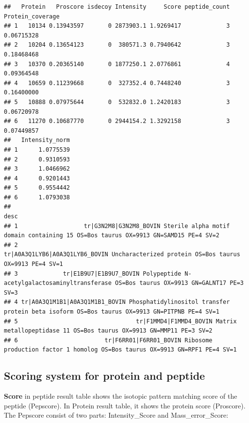 \documentclass[
]{article}
\begin{document}
\begin{verbatim}
##   Protein   Proscore isdecoy Intensity     Score peptide_count Protein_coverage
## 1   10134 0.13943597       0 2873903.1 1.9269417             3       0.06715328
## 2   10204 0.13654123       0  380571.3 0.7940642             3       0.18468468
## 3   10370 0.20365140       0 1877250.1 2.0776861             4       0.09364548
## 4   10659 0.11239668       0  327352.4 0.7448240             3       0.16400000
## 5   10888 0.07975644       0  532832.0 1.2420183             3       0.06720978
## 6   11270 0.10687770       0 2944154.2 1.3292158             3       0.07449857
##   Intensity_norm
## 1      1.0775539
## 2      0.9310593
## 3      1.0466962
## 4      0.9201443
## 5      0.9554442
## 6      1.0793038
##                                                                                                                          desc
## 1                   tr|G3N2M8|G3N2M8_BOVIN Sterile alpha motif domain containing 15 OS=Bos taurus OX=9913 GN=SAMD15 PE=4 SV=2
## 2                                      tr|A0A3Q1LYB6|A0A3Q1LYB6_BOVIN Uncharacterized protein OS=Bos taurus OX=9913 PE=4 SV=1
## 3             tr|E1B9U7|E1B9U7_BOVIN Polypeptide N-acetylgalactosaminyltransferase OS=Bos taurus OX=9913 GN=GALNT17 PE=3 SV=3
## 4 tr|A0A3Q1M1B1|A0A3Q1M1B1_BOVIN Phosphatidylinositol transfer protein beta isoform OS=Bos taurus OX=9913 GN=PITPNB PE=4 SV=1
## 5                                  tr|F1MMD4|F1MMD4_BOVIN Matrix metallopeptidase 11 OS=Bos taurus OX=9913 GN=MMP11 PE=3 SV=2
## 6                         tr|F6RR01|F6RR01_BOVIN Ribosome production factor 1 homolog OS=Bos taurus OX=9913 GN=RPF1 PE=4 SV=1
\end{verbatim}

\hypertarget{scoring-system-for-protein-and-peptide}{%
\subsection{Scoring system for protein and
peptide}\label{scoring-system-for-protein-and-peptide}}

\textbf{Score} in peptide result table shows the isotopic pattern
matching score of the peptide (Pepscore). In Protein result table, it
shows the protein score (Proscore). The Pepscore consist of two parts:
Intensity\_Score and Mass\_error\_Score:
\end{document}
